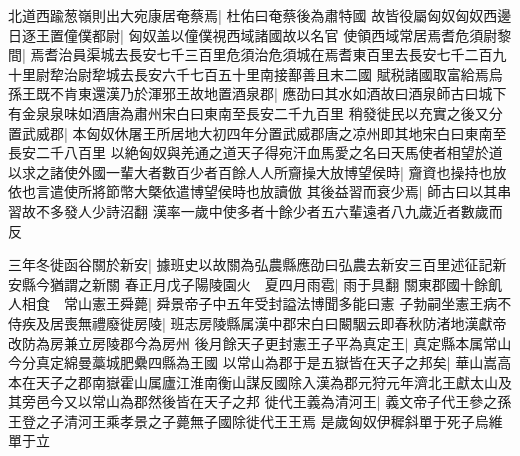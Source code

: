 北道西踰葱嶺則出大宛康居奄蔡焉|{
	杜佑曰奄蔡後為肅特國}
故皆役屬匈奴匈奴西邊日逐王置僮僕都尉|{
	匈奴盖以僮僕視西域諸國故以名官}
使領西域常居焉耆危須尉黎間|{
	焉耆治員渠城去長安七千三百里危須治危須城在焉耆東百里去長安七千二百九十里尉犂治尉犂城去長安六千七百五十里南接鄯善且末二國}
賦税諸國取富給焉烏孫王既不肯東還漢乃於渾邪王故地置酒泉郡|{
	應劭曰其水如酒故曰酒泉師古曰城下有金泉泉味如酒唐為肅州宋白曰東南至長安二千九百里}
稍發徙民以充實之後又分置武威郡|{
	本匈奴休屠王所居地大初四年分置武威郡唐之凉州即其地宋白曰東南至長安二千八百里}
以絶匈奴與羌通之道天子得宛汗血馬愛之名曰天馬使者相望於道以求之諸使外國一輩大者數百少者百餘人人所齎操大放博望侯時|{
	齎資也操持也放依也言遣使所將節幣大槩依遣博望侯時也放讀倣}
其後益習而衰少焉|{
	師古曰以其串習故不多發人少詩沼翻}
漢率一歲中使多者十餘少者五六輩遠者八九歲近者數歲而反

三年冬徙函谷關於新安|{
	據班史以故關為弘農縣應劭曰弘農去新安三百里述征記新安縣今猶謂之新關}
春正月戊子陽陵園火　夏四月雨雹|{
	雨于具翻}
關東郡國十餘飢人相食　常山憲王舜薨|{
	舜景帝子中五年受封謚法博聞多能曰憲}
子勃嗣坐憲王病不侍疾及居喪無禮廢徙房陵|{
	班志房陵縣属漢中郡宋白曰闞駰云即春秋防渚地漢獻帝改防為房兼立房陵郡今為房州}
後月餘天子更封憲王子平為真定王|{
	真定縣本属常山今分真定綿曼藁城肥纍四縣為王國}
以常山為郡于是五嶽皆在天子之邦矣|{
	華山嵩高本在天子之郡南嶽霍山属廬江淮南衡山謀反國除入漢為郡元狩元年濟北王獻太山及其旁邑今又以常山為郡然後皆在天子之邦}
徙代王義為清河王|{
	義文帝子代王參之孫王登之子清河王乘孝景之子薨無子國除徙代王王焉}
是歲匈奴伊穉斜單于死子烏維單于立


